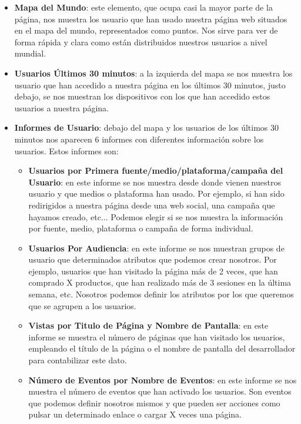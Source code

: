 \begin{itemize}
    \item \textbf{Mapa del Mundo}: este elemento, que ocupa casi la mayor parte de la página, nos muestra los usuario que han usado nuestra página web situados en el mapa del mundo, representados como puntos. Nos sirve para ver de forma rápida y clara como están distribuidos nuestros usuarios a nivel mundial.

    \item \textbf{Usuarios Últimos 30 minutos}: a la izquierda del mapa se nos muestra los usuario que han accedido a nuestra página en los últimos 30 minutos, justo debajo, se nos muestran los dispositivos con los que han accedido estos usuarios a nuestra página.

    \item \textbf{Informes de Usuario}: debajo del mapa y los usuarios de los últimos 30 minutos nos aparecen 6 informes con diferentes información sobre los usuarios. Estos informes son:

    \begin{itemize}
        \item \textbf{Usuarios por Primera fuente/medio/plataforma/campaña del Usuario}: en este informe se nos muestra desde donde vienen nuestros usuario y que medios o plataforma han usado. Por ejemplo, si han sido redirigidos a nuestra página desde una web social, una campaña que hayamos creado, etc... Podemos elegir si se nos muestra la información por fuente, medio, plataforma o campaña de forma individual.

        \item \textbf{Usuarios Por Audiencia}: en este informe se nos muestran grupos de usuario que determinados atributos que podemos crear nosotros. Por ejemplo, usuarios que han visitado la página más de 2 veces, que han comprado X productos, que han realizado más de 3 sesiones en la última semana, etc. Nosotros podemos definir los atributos por los que queremos que se agrupen a los usuarios.

        \item \textbf{Vistas por Titulo de Página y Nombre de Pantalla}: en este informe se muestra el número de páginas que han visitado los usuarios, empleando el título de la página o el nombre de pantalla del desarrollador para contabilizar este dato.

        \item \textbf{Número de Eventos por Nombre de Eventos}: en este informe se nos muestra el número de eventos que han activado los usuarios. Son eventos que podemos definir nosotros mismos y que pueden ser acciones como pulsar un determinado enlace o cargar X veces una página.


\end{itemize}
\end{itemize}
